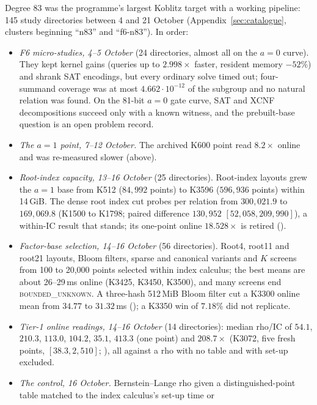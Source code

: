 Degree 83 was the programme's largest Koblitz target with a working
pipeline: 145 study directories between 4 and 21 October
(Appendix~\ref{sec:catalogue}, clusters beginning ``n83'' and ``f6-n83'').
In order:
\begin{itemize}
\item \emph{F6 micro-studies, 4--5 October} (24 directories, almost all on
  the $a=0$ curve). They kept kernel gains (queries up to $2.998\times$
  faster, resident memory $-52\%$) and shrank SAT encodings, but every
  ordinary solve timed out; four-summand coverage was at most
  $4.662\cdot10^{-12}$ of the subgroup and no natural relation was found.
  On the 81-bit $a=0$ gate curve, SAT and XCNF decompositions succeed only
  with a known witness, and the prebuilt-base question is an open problem
  record.
\item \emph{The $a=1$ point, 7--12 October.} The archived K600 point read
  $8.2\times$ online and was re-measured slower (above).
\item \emph{Root-index capacity, 13--16 October} (25 directories). Root-index
  layouts grew the $a=1$ base from K512 ($84{,}992$ points) to K3596
  ($596{,}936$ points) within 14\,GiB. The dense root index cut probes per
  relation from $300{,}021.9$ to $169{,}069.8$ (K1500 to K1798; paired
  difference $130{,}952$ $[52{,}058,209{,}990]$), a within-IC result that
  stands; its one-point online $18.528\times$ is retired
  ().
\item \emph{Factor-base selection, 14--16 October} (56 directories). Root4,
  root11 and root21 layouts, Bloom filters, sparse and canonical variants
  and $K$ screens from 100 to 20{,}000 points selected within index calculus;
  the best means are about 26--29\,ms online (K3425, K3450, K3500), and
  many screens end \textsc{bounded\_unknown}. A three-hash 512\,MiB Bloom
  filter cut a K3300 online mean from $34.77$ to $31.32$\,ms
  (); a K3350 win of
  $7.18\%$ did not replicate.
\item \emph{Tier-1 online readings, 14--16 October} (14 directories): median
  rho/IC of $54.1$, $210.3$, $113.0$, $104.2$, $35.1$, $413.3$ (one point)
  and $208.7\times$ (K3072, five fresh points, $[38.3,2{,}510]$;
  ), all against a rho with no
  table and with set-up excluded.
\item \emph{The control, 16 October.} Bernstein--Lange rho given a
  distinguished-point table matched to the index calculus's set-up time or

\end{itemize}
